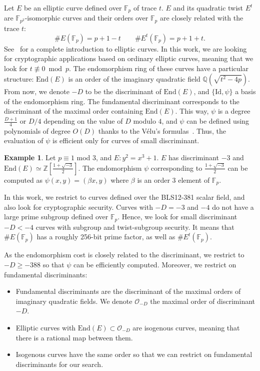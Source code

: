 \documentclass{article}
\newcommand{\Q}{\ensuremath{\mathbb Q}}
\newcommand{\Z}{\ensuremath{\mathbb Z}}
\newcommand{\Fp}{\ensuremath{\mathbb F_p}}
\newcommand{\End}{\ensuremath{\text{End}}}
\theoremstyle{definition}
\newtheorem*{example}{Example}
\begin{document}
Let $E$ be an elliptic curve defined over $\Fp$ of trace $t$. $E$ and
its quadratic twist $E^t$ are $\mathbb F_{p^2}$-isomorphic curves and
their orders over $\Fp$ are closely related with the trace
$t$:
$$\#E(\Fp) = p+1-t\qquad \#E^t(\Fp) = p+1+t.$$
See~\cite{Silverman86} for a complete introduction to elliptic curves.
In this work, we are looking for cryptographic applications based on
ordinary elliptic curves, meaning that we look for $t\not\equiv 0
\bmod p$. The endomorphism ring of these curves have a particular
structure: $\End(E)$ is an order of the imaginary quadratic field
$\Q(\sqrt{t^2-4p})$.
From now, we denote $-D$ to be the discriminant of $\End(E)$, and
$\{\text{Id},\psi\}$ a basis of the endomorphism ring.
The fundamental discriminant corresponds to the discriminant of the
maximal order containing $\End(E)$.
This way, $\psi$ is a degree $\frac{D+1}4$ or $D/4$ depending on the
value of $D$ modulo $4$, and $\psi$ can be defined using polynomials
of degree $O(D)$ thanks to the Vélu's formulas~\cite{velu71}.
Thus, the evaluation of $\psi$ is efficient only for curves of small
discriminant.

\begin{example}\label{ex:psi-j0}
  Let $p\equiv 1$ mod $3$, and $E:y^2=x^3+1$.
  $E$ has discriminant $-3$ and $\End(E) \simeq
  \Z\left[\frac{1+\sqrt{-3}}{2}\right]$. The endomorphism $\psi$
  corresponding to $\frac{1+\sqrt{-3}}2$ can be
    computed as $\psi(x,y) = (\beta x, y)$ where $\beta$ is an order
    $3$ element of $\Fp$.
\end{example}

In this work, we restrict to curves defined over the BLS12-381 scalar
field, and also look for cryptographic security. Curves with $-D=-3$
and $-4$ do not have a large prime subgroup defined over $\Fp$. Hence,
we look for small discriminant $-D<-4$ curves with subgroup and
twist-subgroup security. It means that $\#E(\Fp)$ has a roughly 256-bit
prime factor, as well as $\#E^t(\Fp)$.

As the endomorphism cost is closely related to the discriminant, we
restrict to $-D \geq -388$ so that $\psi$ can be efficiently computed.
Moreover, we restrict on fundamental discriminants:
\begin{itemize}
  \item Fundamental discriminants are the discriminant of the maximal
    orders of imaginary quadratic fields. We denote $\mathcal O_{-D}$ the
    maximal order of discriminant $-D$.
  \item Elliptic curves with $\End(E) \subset \mathcal O_{-D}$ are isogenous
    curves, meaning that there is a rational map between them.
  \item Isogenous curves have the same order so that we can restrict
    on fundamental discriminants for our search.
\end{itemize}
\end{document}
